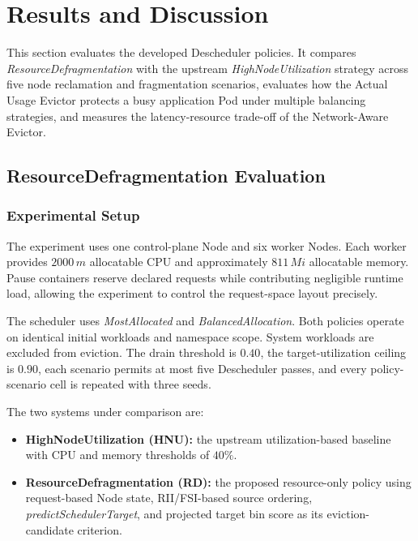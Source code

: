 \section{Results and Discussion}
\label{bab:4}

This section evaluates the developed Descheduler policies. It compares \textit{ResourceDefragmentation} with the upstream \textit{HighNodeUtilization} strategy across five node reclamation and fragmentation scenarios, evaluates how the Actual Usage Evictor protects a busy application Pod under multiple balancing strategies, and measures the latency-resource trade-off of the Network-Aware Evictor.

\subsection{ResourceDefragmentation Evaluation}
\label{sec:resource_defrag_evaluation}

\subsubsection{Experimental Setup}
\label{sec:defrag_experimental_setup}

The experiment uses one control-plane Node and six worker Nodes. Each worker provides \(2000\,m\) allocatable CPU and approximately \(811\,Mi\) allocatable memory. Pause containers reserve declared requests while contributing negligible runtime load, allowing the experiment to control the request-space layout precisely.

The scheduler uses \textit{MostAllocated} and \textit{BalancedAllocation}. Both policies operate on identical initial workloads and namespace scope. System workloads are excluded from eviction. The drain threshold is \(0.40\), the target-utilization ceiling is \(0.90\), each scenario permits at most five Descheduler passes, and every policy-scenario cell is repeated with three seeds.

The two systems under comparison are:

\begin{itemize}
    \item \textbf{HighNodeUtilization (HNU):} the upstream utilization-based baseline with CPU and memory thresholds of \(40\%\).
    \item \textbf{ResourceDefragmentation (RD):} the proposed resource-only policy using request-based Node state, RII/FSI-based source ordering, \textit{predictSchedulerTarget}, and projected target bin score as its eviction-candidate criterion.
\end{itemize}

